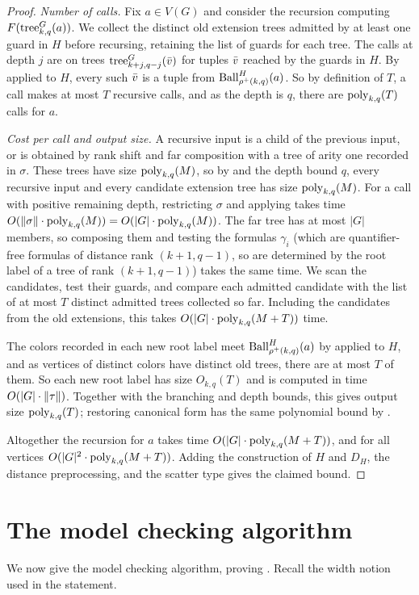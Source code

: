 \begin{proof}
\emph{Number of calls.}
Fix $a\in V(G)$ and consider the recursion computing $F(\mathrm{tree}^G_{k,q}(a))$.
We collect the distinct old extension trees admitted by at least one guard in $H$ before recursing, retaining the list of guards for each tree.
The calls at depth $j$ are on trees $\mathrm{tree}^G_{k+j,q-j}(\bar v)$ for tuples $\bar v$ reached by the guards in $H$.
By  applied to $H$, every such $\bar v$ is a tuple from $\operatorname{Ball}^{H}_{\rho^+(k,q)}(a)$.
So by definition of $T$, a call makes at most $T$ recursive calls, and as the depth is $q$, there are $\mathrm{poly}_{k,q}(T)$ calls for $a$.

\emph{Cost per call and output size.}
A recursive input is a child of the previous input, or is obtained by rank shift and far composition with a  tree of arity one recorded in $\sigma$.
These trees have size $\mathrm{poly}_{k,q}(M)$, so by  and the depth bound $q$, every recursive input and every candidate extension tree has size $\mathrm{poly}_{k,q}(M)$.
For a call with positive remaining depth, restricting $\sigma$ and applying  takes time $O(\lVert \sigma\rVert\cdot\mathrm{poly}_{k,q}(M))=O(|G|\cdot\mathrm{poly}_{k,q}(M))$.
The far tree has at most $|G|$ members, so composing them and testing the formulas $\gamma_i$ 
(which are quantifier-free formulas of distance rank $(k+1,q-1)$, so are determined by the root label of a tree of rank $(k+1,q-1)$) takes the same time.
We scan the candidates, test their guards, and compare each admitted candidate with the list of at most $T$ distinct admitted trees collected so far.
Including the candidates from the old extensions, this takes $O(|G|\cdot\mathrm{poly}_{k,q}(M+T))$ time.

The colors recorded in each new root label meet $\operatorname{Ball}^{H}_{\rho^+(k,q)}(a)$ by  applied to $H$, and as vertices of distinct colors have distinct old trees, there are at most $T$ of them.
So each new root label has size $O_{k,q}(T)$ and is computed in time $O(|G|\cdot\lVert \tau\rVert)$.
Together with the branching and depth bounds, this gives output size $\mathrm{poly}_{k,q}(T)$; restoring canonical form has the same polynomial bound by .

Altogether the recursion for $a$ takes time $O(|G|\cdot\mathrm{poly}_{k,q}(M+T))$, and for all vertices $O(|G|^2\cdot\mathrm{poly}_{k,q}(M+T))$.
Adding the construction of $H$ and $D_H$, the distance preprocessing, and the scatter type gives the claimed bound.
\end{proof}

\section{The model checking algorithm}\label{sec:model-checking}
We now give the model checking algorithm,
proving .
Recall the width notion used in the statement.

